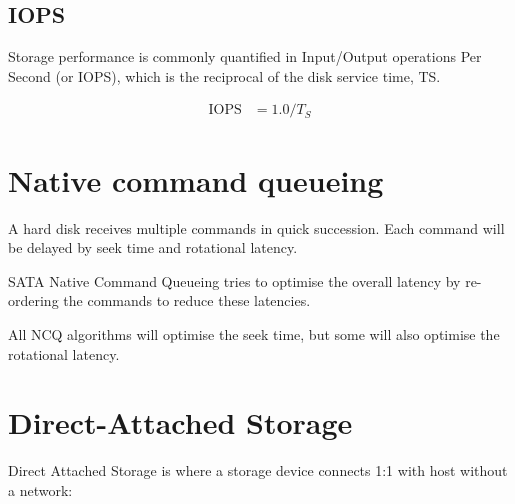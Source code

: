 \subsection{IOPS}
\label{sec:iops}

Storage performance is commonly quantified in Input/Output operations
Per Second (or IOPS), which is the reciprocal of the disk service time,
TS.

\begin{align}
  \mbox{IOPS} & = 1.0 / T_S \label{eq:ts-to-iops}
\end{align}

\section{Native command queueing}
\label{sec:native-command-queueing}


A hard disk receives multiple commands in quick succession.
Each command will be delayed by seek time and rotational latency.

SATA Native Command Queueing tries to optimise the overall latency by
re-ordering the commands to reduce these latencies.

All NCQ algorithms will optimise the seek time, but some will also
optimise the rotational latency.

\section{Direct-Attached Storage}
\label{sec:direct-attached-storage}

Direct Attached Storage is where a storage device connects 1:1 with host
without a network:

